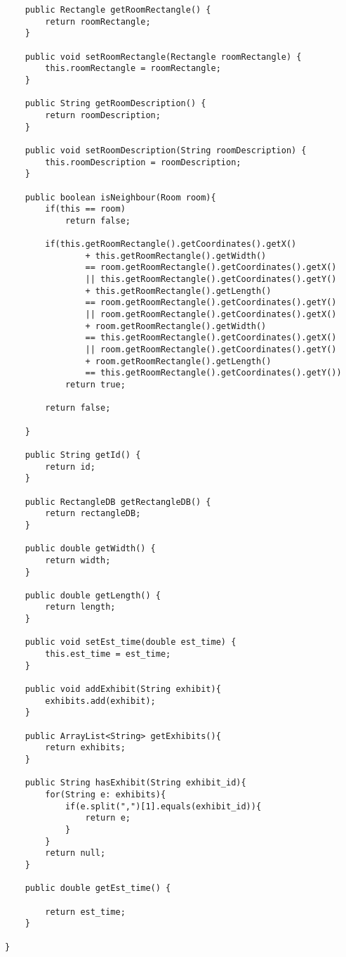 \begin{lstlisting}
    public Rectangle getRoomRectangle() {
        return roomRectangle;
    }

    public void setRoomRectangle(Rectangle roomRectangle) {
        this.roomRectangle = roomRectangle;
    }

    public String getRoomDescription() {
        return roomDescription;
    }

    public void setRoomDescription(String roomDescription) {
        this.roomDescription = roomDescription;
    }

    public boolean isNeighbour(Room room){
        if(this == room)
            return false;

        if(this.getRoomRectangle().getCoordinates().getX()
                + this.getRoomRectangle().getWidth()
                == room.getRoomRectangle().getCoordinates().getX()
                || this.getRoomRectangle().getCoordinates().getY()
                + this.getRoomRectangle().getLength()
                == room.getRoomRectangle().getCoordinates().getY()
                || room.getRoomRectangle().getCoordinates().getX()
                + room.getRoomRectangle().getWidth()
                == this.getRoomRectangle().getCoordinates().getX()
                || room.getRoomRectangle().getCoordinates().getY()
                + room.getRoomRectangle().getLength()
                == this.getRoomRectangle().getCoordinates().getY())
            return true;

        return false;

    }

    public String getId() {
        return id;
    }

    public RectangleDB getRectangleDB() {
        return rectangleDB;
    }

    public double getWidth() {
        return width;
    }

    public double getLength() {
        return length;
    }

    public void setEst_time(double est_time) {
        this.est_time = est_time;
    }

    public void addExhibit(String exhibit){
        exhibits.add(exhibit);
    }

    public ArrayList<String> getExhibits(){
        return exhibits;
    }

    public String hasExhibit(String exhibit_id){
        for(String e: exhibits){
            if(e.split(",")[1].equals(exhibit_id)){
                return e;
            }
        }
        return null;
    }

    public double getEst_time() {

        return est_time;
    }

}
\end{lstlisting}
\newpage
